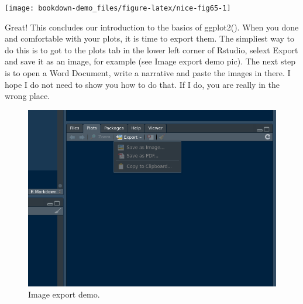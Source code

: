 \documentclass[]{book}
\newenvironment{Shaded}{\begin{snugshade}}{\end{snugshade}}
\newcommand{\CommentTok}[1]{\textcolor[rgb]{0.56,0.35,0.01}{\textit{#1}}}
\newcommand{\DataTypeTok}[1]{\textcolor[rgb]{0.13,0.29,0.53}{#1}}
\newcommand{\DecValTok}[1]{\textcolor[rgb]{0.00,0.00,0.81}{#1}}
\newcommand{\KeywordTok}[1]{\textcolor[rgb]{0.13,0.29,0.53}{\textbf{#1}}}
\newcommand{\NormalTok}[1]{#1}
\newcommand{\OperatorTok}[1]{\textcolor[rgb]{0.81,0.36,0.00}{\textbf{#1}}}
\newcommand{\StringTok}[1]{\textcolor[rgb]{0.31,0.60,0.02}{#1}}
\begin{document}
\begin{Shaded}
\end{Shaded}

\begin{center}\texttt{[image: bookdown-demo\_files/figure-latex/nice-fig65-1]} \end{center}

Great! This concludes our introduction to the basics of ggplot2(). When you done and comfortable with your plots, it is time to export them. The simpliest way to do this is to got to the plots tab in the lower left corner of Rstudio, selext Export and save it as an image, for example (see Image export demo pic). The next step is to open a Word Document, write a narrative and paste the images in there. I hope I do not need to show you how to do that. If I do, you are really in the wrong place.

\begin{figure}
\centering
\includegraphics{imageExport.png}
\caption{Image export demo.}
\end{figure}
\end{document}
